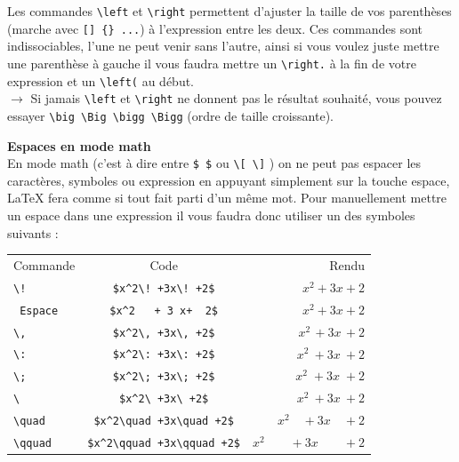 \documentclass[11pt]{article}				%
\begin{document}
Les commandes \verb|\left| et \verb|\right| permettent d'ajuster la taille de vos parenthèses (marche avec \verb|[] {} ...|) à l'expression entre les deux. Ces commandes sont indissociables, l'une ne peut venir sans l'autre, ainsi si vous voulez juste mettre une parenthèse à gauche il vous faudra mettre un \verb|\right.| à la fin de votre expression et un \verb|\left(| au début.\\

$\rightarrow$ Si jamais \verb|\left| et \verb|\right| ne donnent pas le résultat souhaité, vous pouvez essayer \verb|\big \Big \bigg \Bigg| (ordre de taille croissante).

\newpage

\textbf{Espaces en mode math}\\

En mode math (c'est à dire entre \verb|$ $| ou \verb|\[ \]| ) on ne peut pas espacer les caractères, symboles ou expression en appuyant simplement sur la touche espace, LaTeX fera comme si tout fait parti d'un même mot. Pour manuellement mettre un espace dans une expression il vous faudra donc utiliser un des symboles suivants :\\

\begin{center}
	\begin{tabular}{lcr}
	
	Commande & Code   &  Rendu \\ 
	
	\verb|\!|  & \verb|$x^2\! +3x\! +2$| & $ x^2\! +3x\! +2$   \\ 
	 
	\verb| Espace |&\verb|$x^2   + 3 x+  2$|  & $x^2+3x+2$ \\ 
	 
	 \verb|\,| & \verb|$x^2\, +3x\, +2$| & $x^2\, +3x\, +2$ \\ 
	 
	 \verb|\:|& \verb|$x^2\: +3x\: +2$| & $x^2\: +3x\: +2$ \\ 
	 
	 \verb|\;|& \verb|$x^2\; +3x\; +2$| & $x^2\; +3x\; +2$ \\ 
	 
	 \verb|\ | & \verb|$x^2\ +3x\ +2$| &  $x^2\ +3x\ +2$ \\ 
	 
	\verb|\quad | & \verb|$x^2\quad +3x\quad +2$| & $x^2\quad +3x\quad +2$  \\ 
	 
	 \verb|\qquad | & \verb|$x^2\qquad +3x\qquad +2$| & $x^2\qquad +3x\qquad +2$  \\ 
\end{tabular}
\end{center} 
\end{document}
